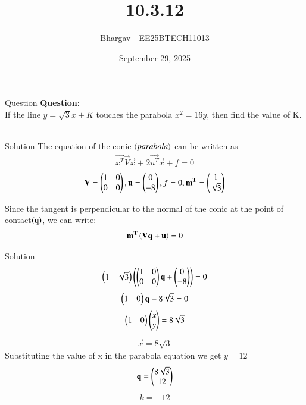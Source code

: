 \documentclass{beamer}
\title{10.3.12}
\date{September 29, 2025}
\author{Bhargav - EE25BTECH11013}
\begin{document}
\frame{\titlepage}

\begin{frame}{Question}
\textbf{Question}: \\
If the line $y = \sqrt{3}x + K$ touches the parabola $x^2 = 16y$, then find the value of K.\\ \\
\end{frame}
\begin{frame}{Solution}
The equation of the conic $\left(parabola\right)$ can be written as
\begin{align}
\vec{x^T}\vec{V}\vec{x} + 2\vec{u^T}\vec{x} + f = 0
\end{align}
\begin{align}
\mathbf{V} = \begin{pmatrix}1 & 0 \\ 0 & 0\end{pmatrix}, \mathbf{u} = \begin{pmatrix}0 \\ -8\end{pmatrix}, f=0, \mathbf{m^T} = \begin{pmatrix}1 \\ \sqrt{3}\end{pmatrix}
\end{align}

Since the tangent is perpendicular to the normal of the conic at the point of contact$\left(\mathbf{q}\right)$, we can write:
\begin{align}
\mathbf{m^T}\left(\mathbf{\mathbf{V}\mathbf{q} + \mathbf{u}}\right) = 0
\end{align}
\end{frame}

\begin{frame}{Solution}
\begin{align}
\begin{pmatrix}1 & \sqrt{3}\end{pmatrix}\left(\begin{pmatrix}1 & 0 \\ 0 & 0\end{pmatrix}\mathbf{q} + \begin{pmatrix}0 \\ -8\end{pmatrix}\right) = 0
\end{align}
\begin{align}
\begin{pmatrix}1 & 0\end{pmatrix}\mathbf{q} - 8\sqrt{3} = 0
\end{align}
\begin{align}
\begin{pmatrix}1 & 0\end{pmatrix}\begin{pmatrix}x \\ y\end{pmatrix} = 8\sqrt{3}
\end{align}
\begin{align}
\vec{x} = 8\sqrt{3}
\end{align}
Substituting the value of x in the parabola equation we get $y = 12$
\begin{align}
\mathbf{q} = \begin{pmatrix}8\sqrt{3} \\ 12\end{pmatrix}
\end{align}
\begin{align}
k = -12
\end{align}
\end{frame}
\end{document}
